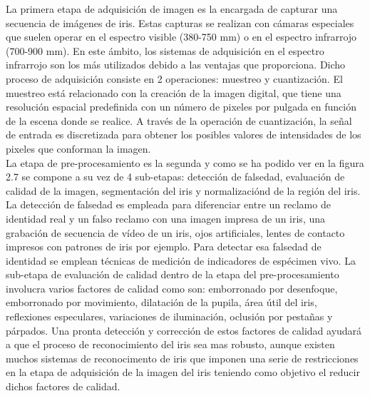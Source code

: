 La primera etapa de adquisición de imagen es la encargada de capturar una secuencia de imágenes de iris. Estas capturas se realizan con cámaras especiales que suelen operar en el espectro visible (380-750 mm) o en el espectro infrarrojo (700-900 mm). En este ámbito, los sistemas de adquisición en el espectro infrarrojo son los más utilizados debido a las ventajas que proporciona. Dicho proceso de adquisición consiste en 2 operaciones: muestreo y cuantización. El muestreo está relacionado con la creación de la imagen digital, que tiene una resolución espacial predefinida con un número de pixeles por pulgada en función de la escena donde se realice. A través de la operación de cuantización, la señal de entrada es discretizada para obtener los posibles valores de intensidades de los pixeles que conforman la imagen. \\

La etapa de pre-procesamiento es la segunda y como se ha podido ver en la figura 2.7 se compone a su vez de 4 sub-etapas: detección de falsedad, evaluación de calidad de la imagen, segmentación del iris y normalizaciónd de la región del iris. La detección de falsedad es empleada para diferenciar entre un reclamo de identidad real y un falso reclamo con una imagen impresa de un iris, una grabación de secuencia de vídeo de un iris, ojos artificiales, lentes de contacto impresos con patrones de iris por ejemplo. Para detectar esa falsedad de identidad se emplean técnicas de medición de indicadores de espécimen vivo. La sub-etapa de evaluación de calidad dentro de la etapa del pre-procesamiento involucra varios factores de calidad como son: emborronado por desenfoque, emborronado por movimiento, dilatación de la pupila, área útil del iris, reflexiones especulares, variaciones de iluminación, oclusión por pestañas y párpados. Una pronta detección y corrección de estos factores de calidad ayudará a que el proceso de reconocimiento del iris sea mas robusto, aunque existen muchos sistemas de reconocimento de iris que imponen una serie de restricciones en la etapa de adquisición de la imagen del iris teniendo como objetivo el reducir dichos factores de calidad. \\

